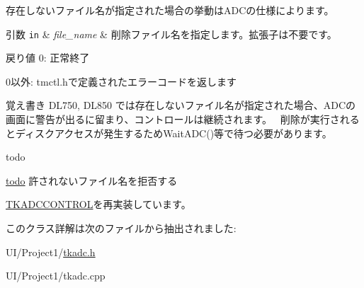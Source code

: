 存在しないファイル名が指定された場合の挙動は\+A\+D\+Cの仕様によります。 
\begin{DoxyParams}[1]{引数}
\mbox{\tt in}  & {\em file\+\_\+name} & 削除ファイル名を指定します。拡張子は不要です。 \\
\hline
\end{DoxyParams}
\begin{DoxyReturn}{戻り値}
0\+: 正常終了 

0以外\+: tmctl.\+hで定義されたエラーコードを返します 
\end{DoxyReturn}
\begin{DoxyNote}{覚え書き}
D\+L750, D\+L850 では存在しないファイル名が指定された場合、\+A\+D\+Cの画面に警告が出るに留まり、コントロールは継続されます。~\newline
 削除が実行されるとディスクアクセスが発生するため\+Wait\+A\+D\+C()等で待つ必要があります。 
\end{DoxyNote}
\begin{DoxyRefDesc}{todo}
\item[\hyperlink{todo__todo000002}{todo}]許されないファイル名を拒否する \end{DoxyRefDesc}


\hyperlink{class_t_k_a_d_c_c_o_n_t_r_o_l_afa385509f61162198950676d279f4c3c}{T\+K\+A\+D\+C\+C\+O\+N\+T\+R\+OL}を再実装しています。



このクラス詳解は次のファイルから抽出されました\+:\begin{DoxyCompactItemize}
\item 
U\+I/\+Project1/\hyperlink{tkadc_8h}{tkadc.\+h}\item 
U\+I/\+Project1/tkadc.\+cpp\end{DoxyCompactItemize}
